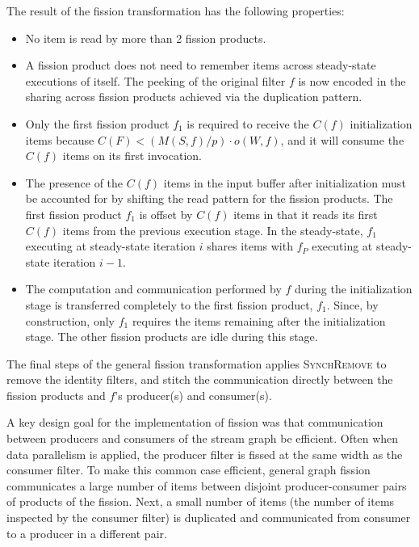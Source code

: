 The result of the fission transformation has the following properties:
\begin{itemize}
\item No item is read by more than 2 fission products.
\item A fission product does not need to remember items across
  steady-state executions of itself. The peeking of the original
  filter $f$ is now encoded in the sharing across fission products
  achieved via the duplication pattern.
\item Only the first fission product $f_1$ is required to receive the $C(f)$
  initialization  items because $C(F) < (M(S,f) / p) \cdot o(W, f)$,
  and it will consume the $C(f)$ items on its first invocation.
\item The presence of the $C(f)$ items in the input buffer after
  initialization must be accounted for by shifting the read pattern
  for the fission products.  The first fission product $f_1$ is offset by
  $C(f)$ items in that it reads its first $C(f)$ items from the
  previous execution stage.  In the steady-state, $f_1$ executing at
  steady-state iteration $i$ shares items with $f_P$ executing at
  steady-state iteration $i-1$.
\item The computation and communication performed by $f$ during the
  initialization stage is transferred completely to the first fission
  product, $f_1$.  Since, by construction, only $f_1$ requires the
  items remaining after the initialization stage.  The other fission
  products are idle during this stage.
\end{itemize}

The final steps of the general fission transformation applies
\textsc{SynchRemove} to remove the identity filters, and stitch the
communication directly between the fission products and $f$'s
producer(s) and consumer(s).
 
A key design goal for the implementation of fission was that
communication between producers and consumers of the stream graph be
efficient.  Often when data parallelism is applied, the producer
filter is fissed at the same width as the consumer
filter.  To make this common case efficient, general
graph fission communicates a large number of items between disjoint
producer-consumer pairs of products of the fission.  Next, a small number of
items (the number of items inspected by the consumer filter) is
duplicated and communicated from consumer to a producer in a different
pair.

